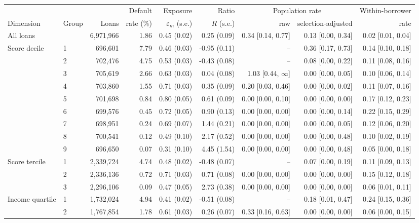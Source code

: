 \begin{tabular}{llrrrrrrr}
\toprule
 & & & Default & Exposure & Ratio & \multicolumn{2}{c}{Population rate} & Within-borrower \\
\cmidrule(lr){7-8}
Dimension & Group & Loans & rate (\%) & $\varepsilon_m$ (s.e.) & $R$ (s.e.) & raw & selection-adjusted & rate \\
\midrule
All loans &  & 6,971,966 & 1.86 & 0.45 (0.02) & 0.25 (0.09) & 0.34 [0.14, 0.77] & 0.13 [0.00, 0.34] & 0.02 [0.01, 0.04] \\
\addlinespace
Score decile & 1 & 696,601 & 7.79 & 0.46 (0.03) & -0.95 (0.11) & -- & 0.36 [0.17, 0.73] & 0.14 [0.10, 0.18] \\
 & 2 & 702,476 & 4.75 & 0.53 (0.03) & -0.43 (0.08) & -- & 0.08 [0.00, 0.22] & 0.11 [0.08, 0.16] \\
 & 3 & 705,619 & 2.66 & 0.63 (0.03) & 0.04 (0.08) & 1.03 [0.44, $\infty$] & 0.00 [0.00, 0.05] & 0.10 [0.06, 0.14] \\
 & 4 & 703,860 & 1.55 & 0.71 (0.03) & 0.35 (0.09) & 0.20 [0.03, 0.46] & 0.00 [0.00, 0.02] & 0.11 [0.07, 0.16] \\
 & 5 & 701,698 & 0.84 & 0.80 (0.05) & 0.61 (0.09) & 0.00 [0.00, 0.10] & 0.00 [0.00, 0.00] & 0.17 [0.12, 0.23] \\
 & 6 & 699,576 & 0.45 & 0.72 (0.05) & 0.90 (0.13) & 0.00 [0.00, 0.00] & 0.00 [0.00, 0.14] & 0.22 [0.15, 0.29] \\
 & 7 & 698,951 & 0.24 & 0.69 (0.07) & 1.44 (0.21) & 0.00 [0.00, 0.00] & 0.00 [0.00, 0.05] & 0.12 [0.06, 0.20] \\
 & 8 & 700,541 & 0.12 & 0.49 (0.10) & 2.17 (0.52) & 0.00 [0.00, 0.00] & 0.00 [0.00, 0.48] & 0.10 [0.02, 0.19] \\
 & 9 & 696,650 & 0.07 & 0.31 (0.10) & 4.45 (1.54) & 0.00 [0.00, 0.00] & 0.00 [0.00, 0.48] & 0.05 [0.00, 0.18] \\
\addlinespace
Score tercile & 1 & 2,339,724 & 4.74 & 0.48 (0.02) & -0.48 (0.07) & -- & 0.07 [0.00, 0.19] & 0.11 [0.09, 0.13] \\
 & 2 & 2,336,136 & 0.72 & 0.71 (0.03) & 0.71 (0.08) & 0.00 [0.00, 0.00] & 0.00 [0.00, 0.00] & 0.15 [0.12, 0.18] \\
 & 3 & 2,296,106 & 0.09 & 0.47 (0.05) & 2.73 (0.38) & 0.00 [0.00, 0.00] & 0.00 [0.00, 0.00] & 0.06 [0.01, 0.11] \\
\addlinespace
Income quartile & 1 & 1,732,024 & 4.94 & 0.41 (0.02) & -0.51 (0.08) & -- & 0.18 [0.01, 0.47] & 0.24 [0.15, 0.36] \\
 & 2 & 1,767,854 & 1.78 & 0.61 (0.03) & 0.26 (0.07) & 0.33 [0.16, 0.63] & 0.00 [0.00, 0.00] & 0.06 [0.00, 0.15] \\

\end{tabular}

